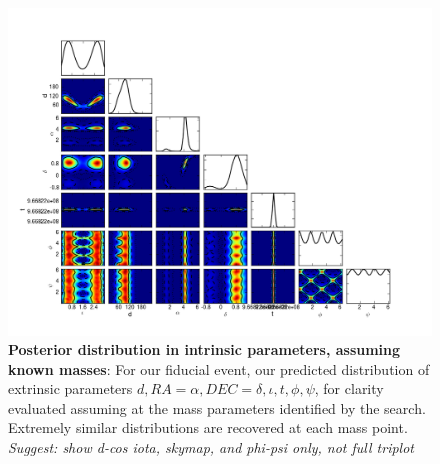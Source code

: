 \documentclass[twocolumn,prd,nofootinbib]{revtex4}
\newcommand\ForInternalReference[1]{#1}
\begin{document}
\begin{figure}
\includegraphics[width=\textwidth]{../Figures/v2runs_coinc_id_833_ILE_triplot_MASS_SET_0}
\caption{\label{fig:FiducialEvent:Triplot:TriggerMasses}\textbf{Posterior distribution in intrinsic parameters, assuming known masses}: For our fiducial event, our predicted
  distribution of extrinsic parameters $d,RA=\alpha,DEC=\delta,\iota,t,\phi,\psi$, for clarity evaluated assuming at the
  mass parameters identified by the search.  Extremely similar distributions are recovered at each mass point. 
\ForInternalReference{  \emph{Suggest: show d-cos iota, skymap, and phi-psi only, not full triplot}}
}
\end{figure}
\end{document}
